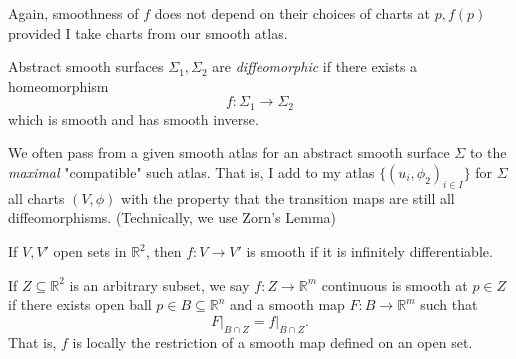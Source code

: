 \begin{note}
    Again, smoothness of \(f\) does not depend on their choices of charts at \(p, f(p)\) provided I take charts from our smooth atlas.
\end{note}
\begin{definition}
    Abstract smooth surfaces \(\Sigma_1, \Sigma_2\) are \textit{diffeomorphic}  if there exists a homeomorphism
    \[
        f: \Sigma_1 \to \Sigma_2
    \]
    which is smooth and has smooth inverse.
\end{definition}
\begin{remark}
    We often pass from a given smooth atlas for an abstract smooth surface \(\Sigma\) to the \textit{maximal} "compatible" such atlas. That is, I add to my atlas \(\{(u_i, \phi_2)_{i\in I}\}\) for \(\Sigma\) all charts \((V, \phi)\) with the property that the transition maps are still all diffeomorphisms. (Technically, we use Zorn's Lemma)
\end{remark}

If \(V, V'\) open sets in \(\mathbb{R}^2\), then \(f: V \to V'\) is smooth if it is infinitely differentiable.

\begin{definition}
    If \(Z \subseteq \mathbb{R}^2\) is an arbitrary subset, we say \(f: Z \to \mathbb{R}^m\) continuous is smooth at \(p \in Z\) if there exists open ball \(p \in B \subseteq \mathbb{R}^n\) and a smooth map \(F: B \to \mathbb{R}^m\) such that
    \[
        \left. F \right|_{B\cap Z} = \left. f \right|_{B\cap Z}.
    \]
    That is, \(f\) is locally the restriction of a smooth map defined on an open set.
\end{definition}

